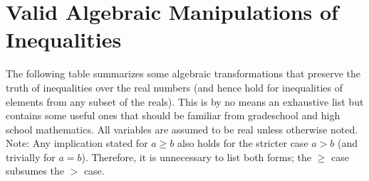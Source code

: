 \section{Valid Algebraic Manipulations of Inequalities}
\label{sec:ManipulatingInequalities}

The following table summarizes some algebraic transformations that preserve the truth of inequalities over the real numbers (and hence hold for inequalities of elements from any subset of the reals). This is by no means an exhaustive list but contains some useful ones that should be familiar from gradeschool and high school mathematics. All variables are assumed to be real unless otherwise noted. \steezybreak \\

\noindent Note: Any implication stated for $a \ge b$ also holds for the stricter case 
$a > b$ (and trivially for $a = b$). Therefore, it is unnecessary to list both forms; 
the $\ge$ case subsumes the $>$ case.

